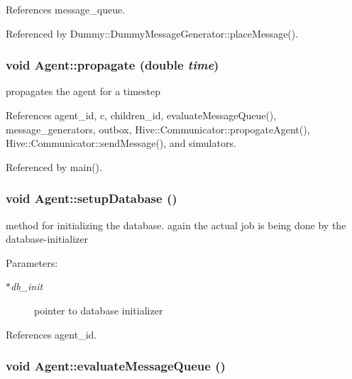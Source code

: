 References message\_\-queue.

Referenced by Dummy::DummyMessageGenerator::placeMessage().
\subsubsection[propagate]{\setlength{\rightskip}{0pt plus 5cm}void Agent::propagate (double {\em time})}\label{classHive_1_1Agent_6eb011086d7ad1640a466affe952b78f}


propagates the agent for a timestep 



References agent\_\-id, c, children\_\-id, evaluateMessageQueue(), message\_\-generators, outbox, Hive::Communicator::propogateAgent(), Hive::Communicator::sendMessage(), and simulators.

Referenced by main().
\subsubsection[setupDatabase]{\setlength{\rightskip}{0pt plus 5cm}void Agent::setupDatabase ()}\label{classHive_1_1Agent_0bf4d254bc310eb8eb9ea16b50571ee3}


method for initializing the database. again the actual job is being done by the database-initializer \begin{Desc}
\item[Parameters:]
\begin{description}
\item[{\em $\ast$db\_\-init}]pointer to database initializer \end{description}
\end{Desc}


References agent\_\-id.
\subsubsection[evaluateMessageQueue]{\setlength{\rightskip}{0pt plus 5cm}void Agent::evaluateMessageQueue ()\hspace{0.3cm}{\tt  [protected]}}\label{classHive_1_1Agent_1da352e749752c141c4b3c4566c2023d}


